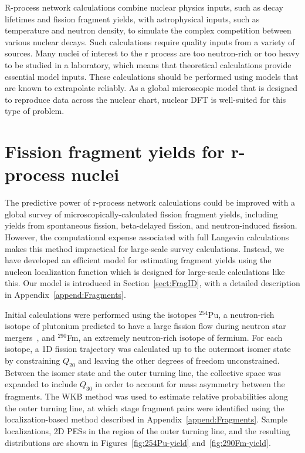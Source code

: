 R-process network calculations combine nuclear physics inputs, such as decay lifetimes and fission fragment yields, with astrophysical inputs, such as temperature and neutron density, to simulate the complex competition between various nuclear decays. Such calculations require quality inputs from a variety of sources. Many nuclei of interest to the r process are too neutron-rich or too heavy to be studied in a laboratory, which means that theoretical calculations provide essential model inputs. These calculations should be performed using models that are known to extrapolate reliably. As a global microscopic model that is designed to reproduce data across the nuclear chart, nuclear DFT is well-suited for this type of problem.

\section{Fission fragment yields for r-process nuclei}
The predictive power of r-process network calculations could be improved with a global survey of microscopically-calculated fission fragment yields, including yields from spontaneous fission, beta-delayed fission, and neutron-induced fission. However, the computational expense associated with full Langevin calculations makes this method impractical for large-scale survey calculations. Instead, we have developed an efficient model for estimating fragment yields using the nucleon localization function which is designed for large-scale calculations like this. Our model is introduced in Section~\ref{sect:FragID}, with a detailed description in Appendix~\ref{append:Fragments}.


Initial calculations were performed using the isotopes $^{254}$Pu, a neutron-rich isotope of plutonium predicted to have a large fission flow during neutron star mergers~\cite{Vassh2019}, and $^{290}$Fm, an extremely neutron-rich isotope of fermium. For each isotope, a 1D fission trajectory was calculated up to the outermost isomer state by constraining $Q_{20}$ and leaving the other degrees of freedom unconstrained. Between the isomer state and the outer turning line, the collective space was expanded to include $Q_{30}$ in order to account for mass asymmetry between the fragments. The WKB method was used to estimate relative probabilities along the outer turning line, at which stage fragment pairs were identified using the localization-based method described in Appendix~\ref{append:Fragments}. Sample localizations, 2D PESs in the region of the outer turning line, and the resulting distributions are shown in Figures~\ref{fig:254Pu-yield} and~\ref{fig:290Fm-yield}.

